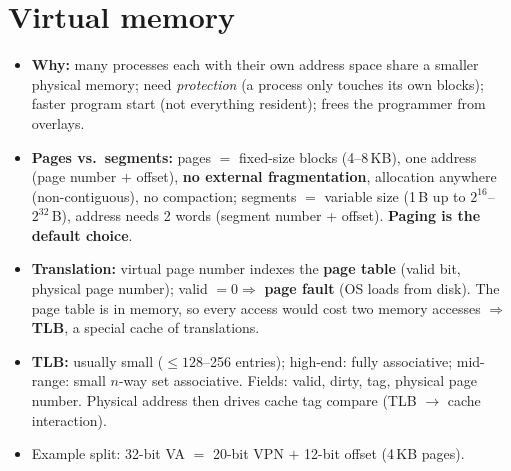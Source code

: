 \section{Virtual memory}
\begin{itemize}
\item \textbf{Why:} many processes each with their own address space share a smaller physical memory; need \emph{protection} (a process only touches its own blocks); faster program start (not everything resident); frees the programmer from overlays.
\item \textbf{Pages vs.\ segments:} pages $=$ fixed-size blocks (4--8\,KB), one address (page number $+$ offset), \textbf{no external fragmentation}, allocation anywhere (non-contiguous), no compaction; segments $=$ variable size (1\,B up to $2^{16}$--$2^{32}$\,B), address needs 2 words (segment number + offset). \textbf{Paging is the default choice}.
\item \textbf{Translation:} virtual page number indexes the \textbf{page table} (valid bit, physical page number); valid $=0\Rightarrow$ \textbf{page fault} (OS loads from disk). The page table is in memory, so every access would cost two memory accesses $\Rightarrow$ \textbf{TLB}, a special cache of translations.
\item \textbf{TLB:} usually small ($\le128$--256 entries); high-end: fully associative; mid-range: small $n$-way set associative. Fields: valid, dirty, tag, physical page number. Physical address then drives cache tag compare (TLB $\rightarrow$ cache interaction).
\item Example split: 32-bit VA $=$ 20-bit VPN $+$ 12-bit offset (4\,KB pages).
\end{itemize}

